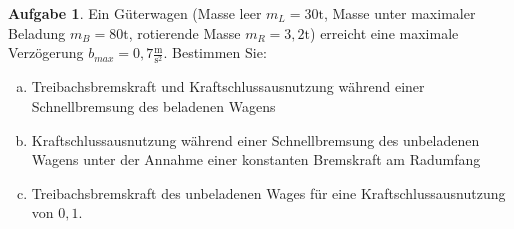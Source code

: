 \documentclass[10pt,a4paper,headsepline,smallheadings]{scrartcl}
\theoremstyle{definition}
\newtheorem{aufgabe}{Aufgabe}
\begin{document}
\begin{aufgabe}
Ein G\"uterwagen (Masse leer $m_{L} = 30 \mathrm{t}$, Masse unter maximaler Beladung $m_{B} = 80 \mathrm{t}$, rotierende Masse $m_{R} = 3{,}2 \mathrm{t}$) erreicht eine maximale Verz\"ogerung $b_{max} = 0{,}7 \frac{\mathrm{m}}{\mathrm{s}^2}$.
Bestimmen Sie:
\begin{enumerate}[a)]
\item Treibachsbremskraft und Kraftschlussausnutzung w\"ahrend einer Schnellbremsung des beladenen Wagens
\item Kraftschlussausnutzung w\"ahrend einer Schnellbremsung des unbeladenen Wagens unter der Annahme einer konstanten Bremskraft am Radumfang
\item Treibachsbremskraft des unbeladenen Wages f\"ur eine Kraftschlussausnutzung von $0{,1}$.
\end{enumerate}

\end{aufgabe}
\end{document}
